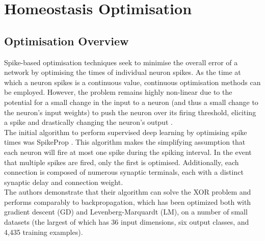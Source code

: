 
\chapter{Homeostasis Optimisation}


\section[Optimisation Overview]{Optimisation Overview}

Spike-based optimisation techniques seek to minimise the overall error of a network by optimising the times of individual neuron spikes. As the time at which a neuron spikes is a continuous value, continuous optimisation methods can be employed. However, the problem remains highly non-linear due to the potential for a small change in the input to a neuron (and thus a small change to the neuron's input weights) to push the neuron over its firing threshold, eliciting a spike and drastically changing the neuron's output \cite{gutig2014spike}. \\

\noindent The initial algorithm to perform supervised deep learning by optimising spike times was SpikeProp \cite{bohte2002error}. This algorithm makes the simplifying assumption that each neuron will fire at most one spike during the spiking interval. In the event that multiple spikes are fired, only the first is optimised. Additionally, each connection is composed of numerous synaptic terminals, each with a distinct synaptic delay and connection weight. \\

\noindent The authors demonstrate that their algorithm can solve the XOR problem and performs comparably to backpropagation, which has been optimized both with gradient descent (GD) and Levenberg-Marquardt (LM), on a number of small datasets (the largest of which has 36 input dimensions, six output classes, and 4,435 training examples). \\

